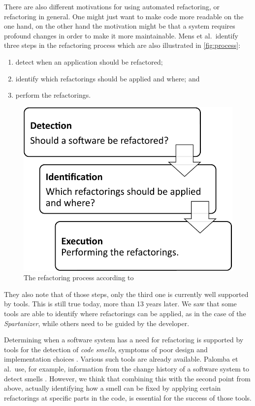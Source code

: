 \documentclass[conference,compsoc,a4paper]{IEEEtran}
\begin{document}
There are also different motivations for using automated refactoring, or refactoring in general. One might just want to 
make code more readable on the one hand, on the other hand the motivation might be that a system requires profound 
changes in order to make it more maintainable.
Mens et al.\ identify three steps in the refactoring process \cite{DBLP:conf/iwpse/MensTM03} which are also illustrated 
in \autoref{fig:process}:
\begin{enumerate}
  \item detect when an application should be refactored;
  \item identify which refactorings should be applied and where; and
  \item perform the refactorings.
\end{enumerate}

\begin{figure}[htb]
  \centering
    \includegraphics[width=0.8\linewidth]{figures/process}
  \caption{The refactoring process according to \cite{DBLP:conf/iwpse/MensTM03}}
  \label{fig:process}
\end{figure}

They also note that of those steps, only the third one is currently well supported by tools. This is still true today, 
more than 13 years later. We saw that some tools are able to identify where refactorings can be applied, as in the case 
of the \emph{Spartanizer}, while others need to be guided by the developer.

Determining when a software system has a need for refactoring is supported by tools for the detection of \emph{code 
smells}, symptoms of poor design and implementation choices \cite{DBLP:books/daglib/0019908}. Various such tools are 
already available. Palomba et al.\ use, for example, information from the change history of a software system to detect 
smells \cite{DBLP:conf/kbse/PalombaBPOLP13}.
However, we think that combining this with the second point from above, actually identifying how a smell can be fixed 
by applying certain refactorings at specific parts in the code, is essential for the success of those tools.
\end{document}
